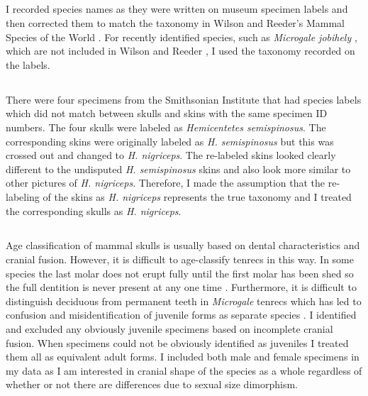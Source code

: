 \subsection{}
	I recorded species names as they were written on museum specimen labels and then corrected them to match the taxonomy in Wilson and Reeder's Mammal Species of the World \citeyearpar{Wilson2005}. For recently identified species, such as \textit{Microgale jobihely} \citep{Goodman2006}, which are not included in Wilson and Reeder \citeyearpar{Wilson2005}, I used the taxonomy recorded on the labels. 

\subsection{}
	
	There were four specimens from the Smithsonian Institute that had species labels which did not match between skulls and skins with the same specimen ID numbers. The four skulls were labeled as \textit{Hemicentetes semispinosus}. The corresponding skins were originally labeled as \textit{H. semispinosus} but this was crossed out and changed to \textit{H. nigriceps}. The re-labeled skins looked clearly different to the undisputed \textit{H. semispinosus} skins and also look more similar to other pictures of \textit{H. nigriceps}. Therefore, I made the assumption that the re-labeling of the skins as \textit{H. nigriceps} represents the true taxonomy and I treated the corresponding skulls as \textit{H. nigriceps}.

\subsection{}

	Age classification of mammal skulls is usually based on dental characteristics and cranial fusion.
 	However, it is difficult to age-classify tenrecs in this way. In some species the last molar does not erupt fully until the first molar has been shed so the full dentition is never present at any one time \citep{Nowak1983}. Furthermore, it is difficult to distinguish deciduous from permanent teeth in \textit{Microgale} tenrecs \citep{Asher2008} which has led to confusion and misidentification of juvenile forms as separate species \citep{Olson2004}.
 	I identified and excluded any obviously juvenile specimens based on incomplete cranial fusion. When specimens could not be obviously identified as juveniles I treated them all as equivalent adult forms. 	
	I included both male and female specimens in my data as I am interested in cranial shape of the species as a whole regardless of whether or not there are differences due to sexual size dimorphism.




